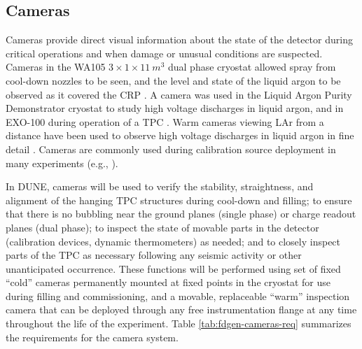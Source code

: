 \subsection{Cameras}
\label{sec:fdgen-slow-cryo-cameras}

Cameras provide direct visual information about the state of the
detector during critical operations and when damage or unusual
conditions are suspected.  Cameras in the WA105 \(3\times 1\times
  1\SI{1}{m^3}\) dual phase cryostat allowed spray from cool-down nozzles
to be seen, and the level and state of the liquid argon to be observed
as it covered the CRP \cite{Murphy:20170516}.  A camera was used in
the Liquid Argon Purity Demonstrator cryostat\cite{Adamowski:2014daa}
to study high voltage discharges in liquid argon, and in EXO-100
during operation of a TPC \cite{Delaquis:2013hva}.  Warm cameras
viewing LAr from a distance have been used to observe high voltage
discharges in liquid argon in fine detail \cite{Auger:2015xlo}.
Cameras are commonly used during calibration source deployment in
many experiments (e.g., \cite{Banks:2014hra}).

In DUNE, cameras will be used to verify the stability, straightness,
and alignment of the hanging TPC structures during cool-down and
filling; to ensure that there is no bubbling near the ground planes
(single phase) or charge readout planes (dual phase); to inspect the
state of movable parts in the detector (calibration devices, dynamic
thermometers) as needed; and to closely inspect parts of the TPC as
necessary following any seismic activity or other unanticipated
occurrence.  These functions will be performed using set of fixed
``cold'' cameras permanently mounted at fixed points in the cryostat
for use during filling and commissioning, and a movable, replaceable
``warm'' inspection camera that can be deployed through any free
instrumentation flange at any time throughout the life of the
experiment.  Table \ref{tab:fdgen-cameras-req} summarizes the
requirements for the camera system.

